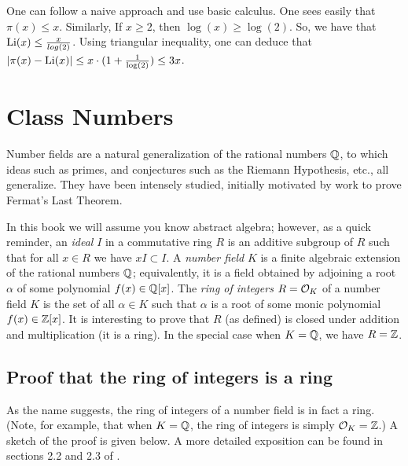 \documentclass{book}
\begin{document}

One can follow a naive approach and use basic calculus.
One sees easily that $\pi(x) \leq x$. Similarly, If $x \geq 2$, then $\log(x) \geq \log(2)$. So, we have that $\operatorname{Li}(x) \leq \frac{x}{log(2)} $.
Using triangular inequality, one can deduce that $|\pi(x)-\operatorname{Li}(x)| \leq x \cdot (1 + \frac{1}{\log(2)}) \leq 3x$.


\section{Class Numbers}
Number fields are a natural generalization of the rational numbers $\mathbb{Q}$,
to which ideas such as primes, and conjectures such as
the Riemann Hypothesis, etc., all generalize.  They have
been intensely studied, initially motivated by
work to prove Fermat's Last Theorem.

In this book we will assume you know abstract algebra; however,
as a quick reminder, an {\em ideal} $I$ in a commutative ring $R$ is an
additive subgroup of $R$ such that for all $x\in R$ we have $xI \subset I$.
A {\em number field} $K$ is a finite algebraic extension of
the rational numbers $\mathbb{Q}$; equivalently, it is a field obtained
by adjoining a root $\alpha$ of some polynomial $f(x) \in \mathbb{Q}[x]$.
The {\em ring of integers} $R=\mathcal{O}_K$ of a number field $K$ is the
set of all $\alpha\in K$ such that $\alpha$ is a root of some
monic polynomial $f(x)\in\mathbb{Z}[x]$.  It is interesting to prove
that $R$ (as defined) is closed under addition and multiplication
(it is a ring).
In the special case when $K=\mathbb{Q}$, we have $R=\mathbb{Z}$.

\subsection{Proof that the ring of integers is a ring}
As the name suggests, the ring of integers of a number field is in fact a ring.
(Note, for example, that when $K = \mathbb{Q}$, the ring of integers is simply
$\mathcal{O}_K = \mathbb{Z}$.)
A sketch of the proof is given below.
A more detailed
exposition can be found in sections 2.2 and 2.3 of \cite{stein:ant}.
\end{document}

